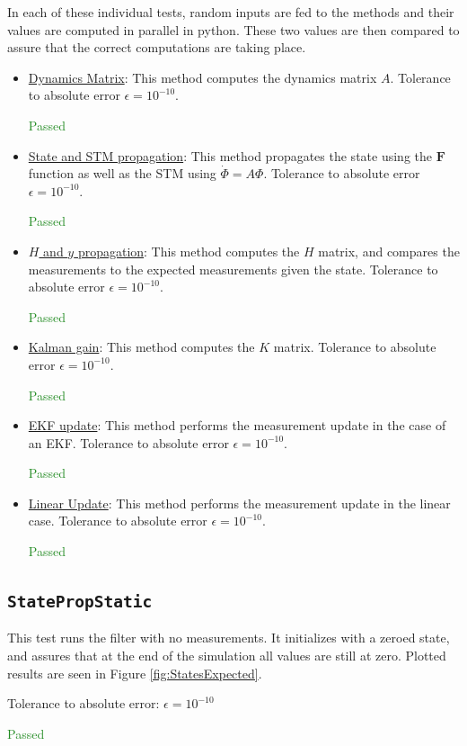 \documentclass[]{BasiliskReportMemo}
\begin{document}
In each of these individual tests, random inputs are fed to the methods and their values are computed in parallel in python. These two values are then compared to assure that the correct computations are taking place. 
\begin{itemize}
\item \underline{Dynamics Matrix}: This method computes the dynamics matrix $A$. Tolerance to absolute error $\epsilon = 10^{-10}$.

\textcolor{ForestGreen}{Passed}
\item \underline{State and STM propagation}: This method propagates the state using the $\bm F$ function as well as the STM using $\dot{\Phi} = A \Phi$. Tolerance to absolute error $\epsilon = 10^{-10}$.

\textcolor{ForestGreen}{Passed}
\item \underline{$H$ and $y$ propagation}: This method computes the $H$ matrix, and compares the measurements to the expected measurements given the state. Tolerance to absolute error $\epsilon = 10^{-10}$.

\textcolor{ForestGreen}{Passed}
\item \underline{Kalman gain}: This method computes the $K$ matrix. Tolerance to absolute error $\epsilon = 10^{-10}$.

\textcolor{ForestGreen}{Passed}
\item \underline{EKF update}: This method performs the measurement update in the case of an EKF. Tolerance to absolute error $\epsilon = 10^{-10}$.

\textcolor{ForestGreen}{Passed}
\item \underline{Linear Update}: This method performs the measurement update in the linear case. Tolerance to absolute error $\epsilon = 10^{-10}$.

\textcolor{ForestGreen}{Passed}
\end{itemize}

\subsection{\texttt{StatePropStatic}}

This test runs the filter with no measurements. It initializes with a zeroed state, and assures that at the end of the simulation all values are still at zero. Plotted results are seen in Figure \ref{fig:StatesExpected}.

Tolerance to absolute error: $\epsilon = 10^{-10}$

\textcolor{ForestGreen}{Passed}
\end{document}
